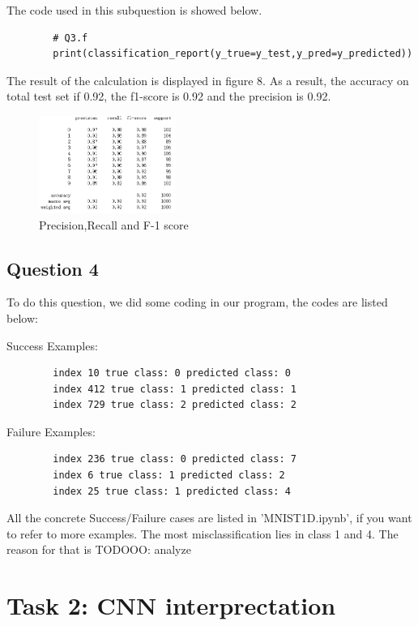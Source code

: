 \documentclass[conference]{IEEEtran}
\begin{document}
	The code used in this subquestion is showed below. \par
	
	
	
	\begin{lstlisting}
		# Q3.f
		print(classification_report(y_true=y_test,y_pred=y_predicted))
	\end{lstlisting} \par
	The result of the calculation is displayed in figure 8. As a result, the accuracy on total test set if 0.92, the f1-score is 0.92 and the precision is 0.92.
	\begin{figure}[h] 
		\centering
		\includegraphics[width=0.4\textwidth]{T1Q3f.png}
		\caption{Precision,Recall and F-1 score}
		\label{Fig.t1q3f}
	\end{figure}
	\subsection{Question 4}
	To do this question, we did some coding in our program, the codes are listed below:
	
	Success Examples:
	\begin{lstlisting}
		index 10 true class: 0 predicted class: 0
		index 412 true class: 1 predicted class: 1
		index 729 true class: 2 predicted class: 2
	\end{lstlisting}
	Failure Examples:
	\begin{lstlisting}
		index 236 true class: 0 predicted class: 7
		index 6 true class: 1 predicted class: 2
		index 25 true class: 1 predicted class: 4
	\end{lstlisting}
	
	All the concrete Success/Failure cases are listed in 'MNIST1D.ipynb', if you want to refer to more examples.
	The most misclassification lies in class 1 and 4.
	The reason for that is TODOOO: analyze
	
	
	\section{Task 2: CNN interprectation}
	
\end{document}
